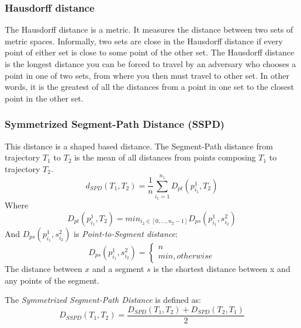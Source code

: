 \documentclass[a4paper, 12pt]{article}
\begin{document}
\subsubsection{Hausdorff distance}
The Hausdorff distance is a metric. It measures the distance between two sets of metric spaces. Informally, two sets are close in the Hausdorff distance if every point of either set is close to some point of the other set. The Hausdorff distance is the longest distance you can be forced to travel by an adversary who chooses a point in one of two sets, from where you then must travel to other set. In other words, it is the greatest of all the distances from a point in one set to the closest point in the other set.

\subsubsection{Symmetrized Segment-Path Distance (SSPD)}
This distance is a shaped based distance. The Segment-Path distance from trajectory $T_{1}$ to $T_{2}$ is the mean of all distances from points composing $T_{1}$ to trajectory $T_{2}$.
\begin{equation} \label{eq7}
    d_{SPD}(T_{1},T_{2}) = \frac{1}{n} \sum_{i_{1}=1}^{n_{1}}D_{pt}(p_{i_{1}}^1, T_{2})
\end{equation}
Where
\begin{equation} \label{eq8}
    D_{pt}(p_{i_{1}}^1, T_{2}) = min_{i_{2} \in [0,\dots,n_{2}-1]}D_{ps}(p_{i_{1}}^1, s_{i_{2}}^2)
\end{equation}
And $D_{ps}(p_{i_{1}}^1, s_{i_{2}}^2)$ is \textit{Point-to-Segment distance}:
\begin{equation} \label{eq9}
    D_{ps}(p_{i_{1}}^1, s_{i_{2}}^2) = \begin{cases}
                                            n \\
                                            min, otherwise 
                                        \end{cases}
\end{equation}
The distance between $x$ and a segment $s$ is the shortest distance between x and any points of the segment.

The \textit{Symmetrized Segment-Path Distance} is defined as:
\begin{equation} \label{eq10}
    D_{SSPD}(T_{1}, T_{2}) = \frac{D_{SPD}(T_{1}, T_{2}) + D_{SPD}(T_{2}, T_{1})}{2}
\end{equation}
\end{document}
